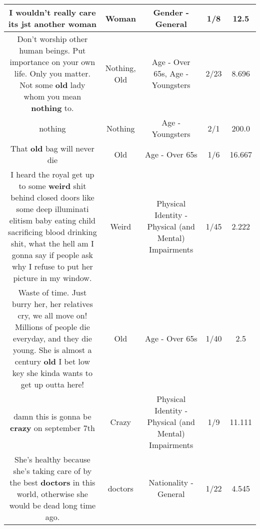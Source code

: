\documentclass[11pt]{article}
\newlength\mylength
\begin{document}
\begin{center}
\begin{longtable}{|C{.65\mylength}|C{.30\mylength}|C{.12\mylength}|C{.12\mylength}|C{.12\mylength}|}
  \small I wouldn't really care its jst another woman\normalsize   & Woman & Gender - General & 1/8 & 12.5 \\  \hline
  \small Don't worship other human beings. Put importance on your own life. Only you matter. Not some \textbf{old} lady whom you mean \textbf{nothing} to.\normalsize   & Nothing, Old & Age - Over 65s, Age - Youngsters & 2/23 & 8.696 \\  \hline
  \small nothing\normalsize   & Nothing & Age - Youngsters & 2/1 & 200.0 \\  \hline
  \small That \textbf{old} bag will never die\normalsize   & Old & Age - Over 65s & 1/6 & 16.667 \\  \hline
  \small I heard the royal get up to some \textbf{weird} shit behind closed doors like some deep illuminati elitism baby eating child sacrificing blood drinking shit, what the hell am I gonna say if people ask why I refuse to put her picture in my window.\normalsize   & Weird & Physical Identity - Physical (and Mental) Impairments & 1/45 & 2.222 \\  \hline
  \small Waste of time. Just burry her, her relatives cry, we all move on! Millions of people die everyday, and they die young. She is almost a century \textbf{old} I bet low key she kinda wants to get up outta here!\normalsize   & Old & Age - Over 65s & 1/40 & 2.5 \\  \hline
  \small damn this is gonna be \textbf{crazy} on september 7th\normalsize   & Crazy & Physical Identity - Physical (and Mental) Impairments & 1/9 & 11.111 \\  \hline
  \small She's healthy because she's taking care of by the best \textbf{doctors} in this world, otherwise she would be dead long time ago.\normalsize   & doctors & Nationality - General & 1/22 & 4.545 \\  \hline

\end{longtable}
\end{center}
\end{document}
